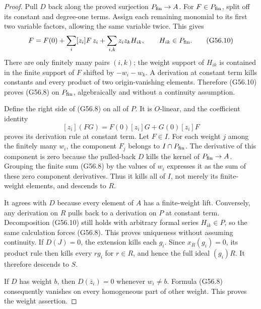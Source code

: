 \begin{proof}
Pull $D$ back along the proved surjection
$P_{\rm fin}\to A$.
For $F\in P_{\rm fin}$, split off its constant
and degree-one terms.  Assign each remaining
monomial to its first two variable factors,
allowing the same variable twice.  This gives
\[
 F=F(0)+\sum_i[z_i]F\,z_i+
                 \sum_{i,k}z_i z_k H_{ik},
       \qquad H_{ik}\in P_{\rm fin}.
                                                               \tag{G56.10}
\]
There are only finitely many pairs $(i,k)$; the
weight support of $H_{ik}$ is contained in the
finite support of $F$ shifted by $-w_i-w_k$.
A derivation at constant term kills constants
and every product of two origin-vanishing
elements.  Therefore (G56.10) proves (G56.8)
on $P_{\rm fin}$, algebraically and without a
continuity assumption.

Define the right side of (G56.8) on all of $P$.
It is $O$-linear, and the coefficient identity
\[
     [z_i](FG)=F(0)[z_i]G+G(0)[z_i]F
                                                               \tag{G56.11}
\]
proves its derivation rule at constant term.
Let $F\in I$.  For each weight $j$ among the
finitely many $w_i$, the component $F_j$
belongs to $I\cap P_{\rm fin}$.
The derivative of this component is zero because
the pulled-back $D$ kills the kernel of
$P_{\rm fin}\to A$.
Grouping the finite sum (G56.8) by the values
of $w_i$ expresses it as the sum of these
zero component derivatives.  Thus it kills all
of $I$, not merely its finite-weight elements,
and descends to $R$.

It agrees with $D$ because every element of $A$
has a finite-weight lift.  Conversely, any
derivation on $R$ pulls back to a derivation on
$P$ at constant term.  Decomposition (G56.10)
still holds with arbitrary formal series
$H_{ik}\in P$, so the same calculation forces
(G56.8).  This proves uniqueness without
assuming continuity.
If $D(J)=0$, the extension kills each $g_i$.
Since $x_R(g_i)=0$, its product rule then
kills every $r g_i$ for $r\in R$, and hence the
full ideal $(g_i)R$.  It therefore descends to
$S$.

If $D$ has weight $b$, then
$D(\overline z_i)=0$ whenever $w_i\ne b$.
Formula (G56.8) consequently vanishes on every
homogeneous part of other weight.  This proves
the weight assertion.


\end{proof}
